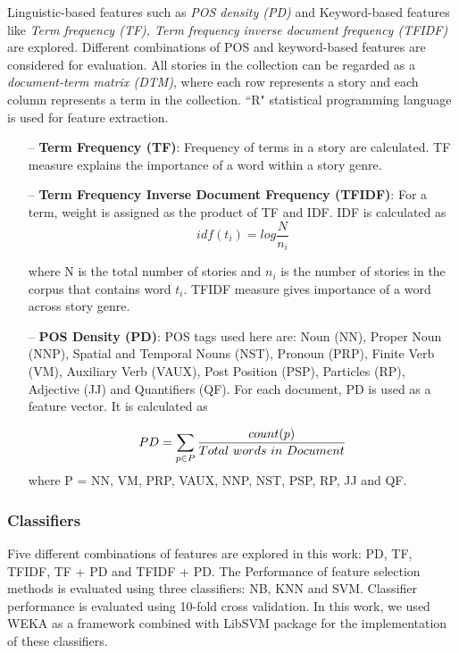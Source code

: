 \documentclass[times, 11pt, a4paper]{article}
\begin{document}
Linguistic-based features such as \textit{POS density (PD)} and Keyword-based features like \textit{Term frequency (TF), Term frequency inverse document frequency (TFIDF)} are explored. Different combinations of POS and keyword-based features are considered for evaluation. All stories in the collection can be regarded as a \textit{document-term matrix (DTM)}, where each row represents a story and each column represents a term in the collection. ``R" statistical programming language is used for feature extraction.


\begin{itemize}
\item[--] \textbf{Term Frequency (TF)}: Frequency of terms in a story are calculated. TF measure explains the importance of a word within a story genre.

\item[--] \textbf{Term Frequency Inverse Document Frequency (TFIDF)}: For a term, weight is assigned as the product of TF and IDF. IDF is calculated as 
\begin{equation*}
idf(t_{i}) = log \frac{N}{n_{i}} 
\end{equation*}

where N is the total number of stories and $n_{i}$ is the number of stories in the corpus that contains word $t_{i}$. TFIDF measure gives importance of a word across story genre.

\item[--] \textbf{POS Density (PD)}: POS tags used here are: Noun (NN), Proper Noun (NNP), Spatial and Temporal Nouns (NST), Pronoun (PRP), Finite Verb (VM), Auxiliary Verb (VAUX), Post Position (PSP), Particles (RP), Adjective (JJ) and Quantifiers (QF). For each document, PD is used as a feature vector. It is calculated as

\begin{equation*}
PD = \sum_{\substack{
   p \in P 
  }}
 \frac{count(p)}{Total\ words\ in\ Document}  \\
 \end{equation*} 
 where P = NN, VM, PRP, VAUX, NNP, NST, PSP, RP, JJ and QF. 

\end{itemize}

\subsubsection{Classifiers}  

Five different combinations of features are explored in this work: PD, TF, TFIDF, TF + PD and TFIDF + PD. The Performance of feature selection methods is evaluated using three classifiers: NB, KNN and SVM. Classifier performance is evaluated using 10-fold cross validation. In this work, we used WEKA as a framework combined with LibSVM package for the implementation of these classifiers.
 
\end{document}
